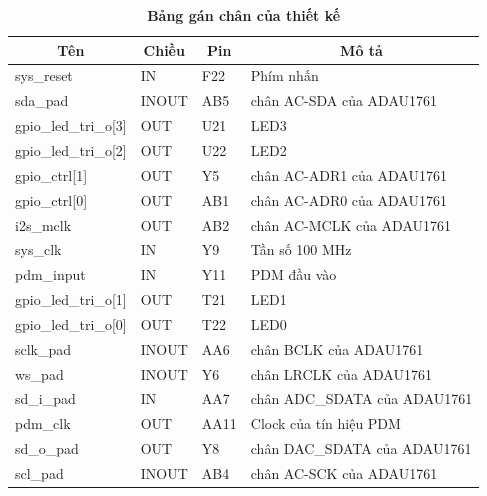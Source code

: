 \begin{table}[H]
\centering
    \caption[Bảng gán chân của thiết kế]{\bfseries \fontsize{12pt}{0pt}\selectfont Bảng gán chân của thiết kế}
   \begin{tabular}{|l|l|l|l|}
\hline
\multicolumn{1}{|c|}{\textbf{Tên}} & \multicolumn{1}{c|}{\textbf{Chiều}} & \multicolumn{1}{c|}{\textbf{Pin}} & \multicolumn{1}{c|}{\textbf{Mô tả}} \\ \hline
sys\_reset               & IN    & F22  & Phím nhấn                    \\ \hline
sda\_pad                 & INOUT & AB5  & chân AC-SDA của ADAU1761     \\ \hline
gpio\_led\_tri\_o{[}3{]} & OUT   & U21  & LED3                         \\ \hline
gpio\_led\_tri\_o{[}2{]} & OUT   & U22  & LED2                         \\ \hline
gpio\_ctrl{[}1{]}        & OUT   & Y5   & chân AC-ADR1 của ADAU1761    \\ \hline
gpio\_ctrl{[}0{]}        & OUT   & AB1  & chân AC-ADR0 của ADAU1761    \\ \hline
i2s\_mclk                & OUT   & AB2  & chân AC-MCLK của ADAU1761    \\ \hline
sys\_clk                 & IN    & Y9   & Tần số 100 MHz               \\ \hline
pdm\_input               & IN    & Y11  & PDM đầu vào                  \\ \hline
gpio\_led\_tri\_o{[}1{]} & OUT   & T21  & LED1                         \\ \hline
gpio\_led\_tri\_o{[}0{]} & OUT   & T22  & LED0                         \\ \hline
sclk\_pad                & INOUT & AA6  & chân BCLK của ADAU1761       \\ \hline
ws\_pad                  & INOUT & Y6   & chân LRCLK của ADAU1761      \\ \hline
sd\_i\_pad               & IN    & AA7  & chân ADC\_SDATA của ADAU1761 \\ \hline
pdm\_clk                 & OUT   & AA11 & Clock của tín hiệu PDM       \\ \hline
sd\_o\_pad               & OUT   & Y8   & chân DAC\_SDATA của ADAU1761 \\ \hline
scl\_pad                 & INOUT & AB4  & chân AC-SCK của ADAU1761     \\ \hline
\end{tabular}
    \label{constraint}
\end{table}


